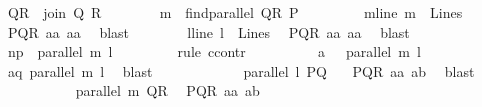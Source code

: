 \begin{isabellebody}
\ {\isacharquery}{\kern0pt}QR\ {\isacharequal}{\kern0pt}\ {\isachardoublequoteopen}join\ Q\ R{\isachardoublequoteclose}\isanewline
\ \ \ \ \ \ \isamarkupfalse%
\ {\isacharquery}{\kern0pt}m\ {\isacharequal}{\kern0pt}\ {\isachardoublequoteopen}find{\isacharunderscore}{\kern0pt}parallel\ {\isacharquery}{\kern0pt}QR\ P{\isachardoublequoteclose}\ \isanewline
\ \ \ \ \ \ \isamarkupfalse%
\ mline{\isacharcolon}{\kern0pt}\ {\isachardoublequoteopen}{\isacharquery}{\kern0pt}m\ {\isasymin}\ Lines{\isachardoublequoteclose}\ \isamarkupfalse%
\ PQR\ a{}a\ a{}a\ \isamarkupfalse%
\ blast\isanewline
\ \ \ \ \ \ \isamarkupfalse%
\ lline{\isacharcolon}{\kern0pt}\ {\isachardoublequoteopen}{\isacharquery}{\kern0pt}l\ {\isasymin}\ Lines{\isachardoublequoteclose}\ \isamarkupfalse%
\ PQR\ a{}a\ a{}a\ \isamarkupfalse%
\ blast\isanewline
\ \ \ \ \ \ \isamarkupfalse%
\ np{\isacharcolon}{\kern0pt}\ {\isachardoublequoteopen}{\isasymnot}\ parallel\ {\isacharquery}{\kern0pt}m\ {\isacharquery}{\kern0pt}l{\isachardoublequoteclose}\ \isanewline
\ \ \ \ \ \ \isamarkupfalse%
\ {\isacharparenleft}{\kern0pt}rule\ ccontr{\isacharparenright}{\kern0pt}\isanewline
\ \ \ \ \ \ \ \ \isamarkupfalse%
\ a{\isacharcolon}{\kern0pt}\ {\isachardoublequoteopen}{\isasymnot}\ {\isasymnot}\ parallel\ {\isacharquery}{\kern0pt}m\ {\isacharquery}{\kern0pt}l{\isachardoublequoteclose}\isanewline
\ \ \ \ \ \ \ \ \isamarkupfalse%
\ \isamarkupfalse%
\ aq{\isacharcolon}{\kern0pt}\ {\isachardoublequoteopen}parallel\ {\isacharquery}{\kern0pt}m\ {\isacharquery}{\kern0pt}l{\isachardoublequoteclose}\ \isamarkupfalse%
\ blast\isanewline
\ \ \ \ \ \ \ \ \isamarkupfalse%
\ \isamarkupfalse%
\ {}{\isacharcolon}{\kern0pt}\ {\isachardoublequoteopen}parallel\ {\isacharquery}{\kern0pt}l\ {\isacharquery}{\kern0pt}PQ{\isachardoublequoteclose}\ \ \isamarkupfalse%
\ PQR\ a{}a\ a{}b\ \isamarkupfalse%
\ blast\isanewline
\ \ \ \ \ \ \ \ \isamarkupfalse%
\ {}{\isacharcolon}{\kern0pt}\ {\isachardoublequoteopen}parallel\ {\isacharquery}{\kern0pt}m\ {\isacharquery}{\kern0pt}QR{\isachardoublequoteclose}\ \isamarkupfalse%
\ PQR\ a{}a\ a{}b\ \isamarkupfalse%

\end{isabellebody}
